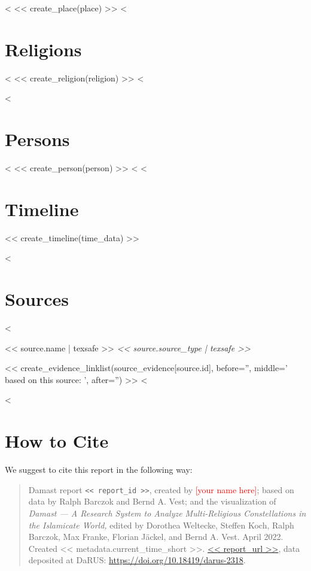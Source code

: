 \documentclass[fontsize=10pt,toc=chapterentrywithdots]{scrreprt}
\begin{document}
<%
<< create_place(place) >>
<%


\clearpage
\chapter{Religions}
\label{sec:religions}

<%
  << create_religion(religion) >>
<%


<%
\clearpage
\chapter{Persons}
\label{sec:persons}

<%
  << create_person(person) >>
<%
<%


\clearpage
\chapter{Timeline}
\label{sec:timeline}

<< create_timeline(time_data) >>


<%
\clearpage
\chapter{Sources}
\label{sec:sources}

\begin{description}
    <%
  \item[\textsc{<< source.short | texsafe >>}]
      \hypertarget{source<<source.id>>}{<< source.name | texsafe >>
        \emph{<< source.source_type | texsafe >>}}

      << create_evidence_linklist(source_evidence[source.id], before='', middle=' based on this source: ', after='') >>
    <%
\end{description}
<%

\clearpage
\chapter*{How to Cite}
\label{sec:how-to-cite}

We suggest to cite this report in the following way:

\begingroup
\small
\begin{quote}
  Damast report \texttt{<< report_id >>}, created by \textcolor{red}{[your name here]};
  based on data by Ralph Barczok and Bernd A. Vest; and the visualization of
  \emph{Damast --- A Research System to Analyze Multi-Religious Constellations in the Islamicate World,}
  edited by Dorothea Weltecke, Steffen Koch, Ralph Barczok, Max Franke, Florian Jäckel, and Bernd A. Vest.
  April 2022.
  Created << metadata.current_time_short >>.
  \url{<< report_url >>}, data deposited at DaRUS:
  \url{https://doi.org/10.18419/darus-2318}.
\end{quote}
\endgroup
\end{document}
